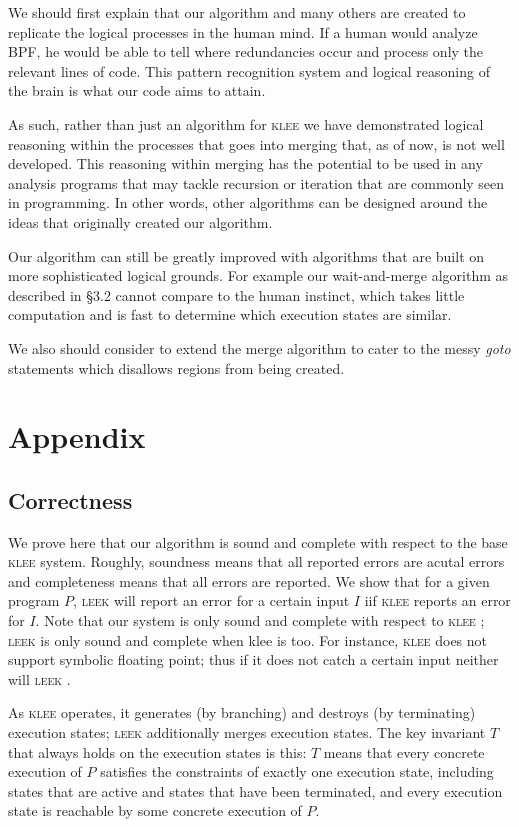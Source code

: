 \documentclass[12pt,a4paper]{article}
\newcommand{\klee}{\textsc{klee }}
\newcommand{\leek}{\textsc{leek }}
\begin{document}
We should first explain that our algorithm and many others are created to replicate the logical processes in the human mind. If a human would analyze BPF, he would be able to tell where redundancies occur and process only the relevant lines of code. This pattern recognition system and logical reasoning of the brain is what our code aims to attain.

As such, rather than just an algorithm for \klee we have demonstrated logical reasoning within the processes that goes into merging that, as of now, is not well developed. This reasoning within merging has the potential to be used in any analysis programs that may tackle recursion or iteration that are commonly seen in programming. In other words, other algorithms can be designed around the ideas that originally created our algorithm.

Our algorithm can still be greatly improved with algorithms that are built on more sophisticated logical grounds. For example our wait-and-merge algorithm as described in \S 3.2 cannot compare to the human instinct, which takes little computation and is fast to determine which execution states are similar.

We also should consider to extend the merge algorithm to cater to the messy \emph{goto} statements which disallows regions from being created. 

\section{Appendix}

\subsection{Correctness}

We prove here that our algorithm is sound and complete with respect to the base \klee system. Roughly, soundness means that all reported errors are acutal errors and completeness means that all errors are reported. We show that for a given program $P$, \leek will report an error for a certain input $I$ iif \klee reports an error for $I$. Note that our system is only sound and complete with respect to \klee; \leek is only sound and complete when klee is too. For instance, \klee does not support symbolic floating point; thus if it does not catch a certain input neither will \leek.

As \klee operates, it generates (by branching) and destroys (by terminating) execution states; \leek additionally merges execution states. The key invariant $T$ that always holds on the execution states is this: $T$ means that every concrete execution of $P$ satisfies the constraints of exactly one execution state, including states that are active and states that have been terminated, and every execution state is reachable by some concrete execution of $P$.
\end{document}
